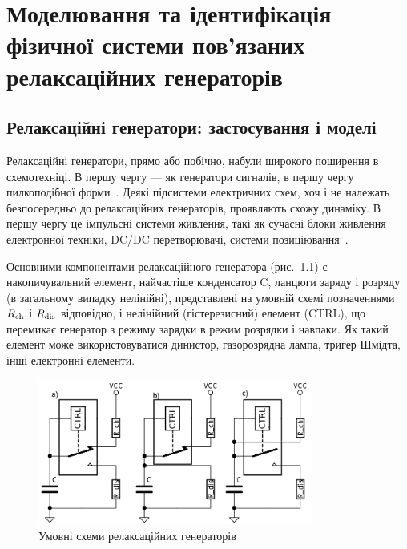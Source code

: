 \chapter{Моделювання та ідентифікація фізичної системи пов'язаних релаксаційних генераторів}

\newcommand{\RelaxBjtIi}{системи з трьох пов'язаних релаксаційних генераторів на парі компліментарних транзисторів}
\newcommand{\RelaxShIi}{системи з трьох пов'язаних релаксаційних генераторів на основі тригерів Шмідта}

\section{Релаксаційні генератори: застосування і моделі}

Релаксаційні генератори, прямо або побічно, набули широкого
поширення в схемотехніці. В першу чергу --- як генератори
сигналів, в першу чергу пилкоподібної форми~\cite{horowitz,
mishenko_du_small_relax}. Деякі підсистеми електричних схем, хоч і
не належать безпосередньо до релаксаційних генераторів,
проявляють схожу динаміку. В першу чергу це імпульсні системи
живлення, такі як сучасні блоки живлення електронної техніки,
DC/DC перетворювачі, системи позиціювання~\cite{atu_st104b}.

Основними компонентами релаксаційного генератора
(рис.~\ref{atu:f:relax_types}) є накопичувальний елемент, найчастіше
конденсатор C, ланцюги заряду і розряду (в загальному випадку
нелінійні), представлені на умовній схемі позначеннями
$R _\mathrm{ch} $ і
$R _\mathrm{dis} $ відповідно, і нелінійний (гістерезисний)
елемент (CTRL), що перемикає генератор з режиму зарядки в режим
розрядки і навпаки. Як такий елемент може використовуватися
динистор, газорозрядна лампа, тригер Шмідта, інші електронні елементи.

\begin{figure}[htb!]
  \centerline{\includegraphics[width=0.8\textwidth]{p/relax_types.png} }
\caption{Умовні схеми релаксаційних генераторів}
\label{atu:f:relax_types}
\end{figure}

